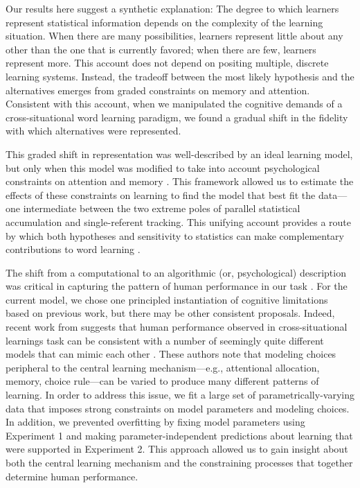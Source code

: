 \documentclass[man,floatsintext]{apa6}
\begin{document}
Our results here suggest a synthetic explanation: The degree to which learners represent statistical information depends on the complexity of the learning situation. When there are many possibilities, learners represent little about any other than the one that is currently favored; when there are few, learners represent more. This account does not depend on positing multiple, discrete learning systems. Instead, the tradeoff between the most likely hypothesis and the alternatives emerges from graded constraints on memory and attention. Consistent with this account, when we manipulated the cognitive demands of a cross-situational word learning paradigm, we found a gradual shift in the fidelity with which alternatives were represented.

This graded shift in representation was well-described by an ideal learning model, but only when this model was modified to take into account psychological constraints on attention and memory \cite{Kachergis2012,Vlach2013,Yurovsky2014}. This framework allowed us to estimate the effects of these constraints on learning to find the model that best fit the data---one intermediate between the two extreme poles of parallel statistical accumulation and single-referent tracking. This unifying account provides a route by which both hypotheses and sensitivity to statistics can make complementary contributions to word learning \cite{Waxman2009,Kachergis2013}. 

The shift from a computational to an algorithmic (or, psychological) description was critical in capturing the pattern of human performance in our task \cite{Marr1982,Frank2010a,Yurovsky2012c}. For the current model, we chose one principled instantiation of cognitive limitations based on previous work, but there may be other consistent proposals. Indeed, recent work from  suggests that human performance observed in cross-situational learnings task can be consistent with a number of seemingly quite different models that can mimic each other \cite<see also,>{Townsend1990}. These authors note that modeling choices peripheral to the central learning mechanism---e.g., attentional allocation, memory, choice rule---can be varied to produce many different patterns of learning. In order to address this issue, we fit a large set of parametrically-varying data that imposes strong constraints on model parameters and modeling choices. In addition, we prevented overfitting by fixing model parameters using Experiment 1 and making parameter-independent predictions about learning that were supported in Experiment 2. This approach allowed us to gain insight about both the central learning mechanism and the constraining processes that together determine human performance.
\end{document}
